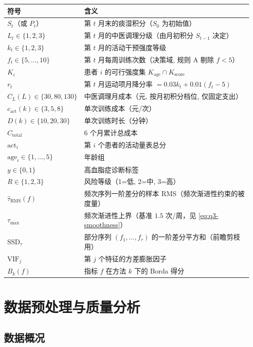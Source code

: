 \documentclass{MathorCupmodeling}
\begin{document}
\begin{longtable}[]{@{}ll@{}}
\toprule\noalign{}
符号 & 含义 \\
\midrule\noalign{}
\endhead
\bottomrule\noalign{}
\endlastfoot
$S_t$（或 $P_t$） & 第 $t$ 月末的痰湿积分（$S_0$ 为初始值） \\
$L_t \in \{1,2,3\}$ & 第 $t$ 月的中医调理分级（由月初积分 $S_{t-1}$ 决定） \\
$k_t \in \{1,2,3\}$ & 第 $t$ 月的活动干预强度等级 \\
$f_t \in \{5,\dots,10\}$ & 第 $t$ 月每周训练次数（决策域, 规则 A 剔除 $f<5$） \\
$K_i$ & 患者 $i$ 的可行强度集 $K_{\text{age}}\cap K_{\text{score}}$ \\
$r_t$ & 第 $t$ 月运动项月降分率 $= 0.03 k_t + 0.01(f_t-5)$ \\
$C_L(L) \in \{30, 80, 130\}$ & 中医调理月成本（元, 按月初积分档位, 仅固定支出） \\
$c_{\text{act}}(k) \in \{3, 5, 8\}$ & 单次训练成本（元/次） \\
$D(k) \in \{10,20,30\}$ & 单次训练时长（分钟） \\
$C_{\text{total}}$ & 6 个月累计总成本 \\
$\text{act}_i$ & 第 $i$ 个患者的活动量表总分 \\
$\text{age}_i \in \{1,\dots,5\}$ & 年龄组 \\
$y \in \{0, 1\}$ & 高血脂症诊断标签 \\
$R \in \{1, 2, 3\}$ & 风险等级（1=低, 2=中, 3=高） \\
$\widehat\tau_{\mathrm{RMS}}(f)$ & 频次序列一阶差分的样本 RMS（频次渐进性约束的被度量） \\
$\tau_{\max}$ & 频次渐进性上界（基准 $1.5$ 次/周，见 \cref{eq:q3-smoothness}） \\
$\mathrm{SSD}_\tau$ & 部分序列 $(f_1,\dots,f_\tau)$ 的一阶差分平方和（前瞻剪枝用） \\
$\text{VIF}_j$ & 第 $j$ 个特征的方差膨胀因子 \\
$B_k(f)$ & 指标 $f$ 在方法 $k$ 下的 Borda 得分 \\
\end{longtable}

\section{数据预处理与质量分析}\label{sec:data-cleaning}

\subsection{数据概况}
\end{document}
